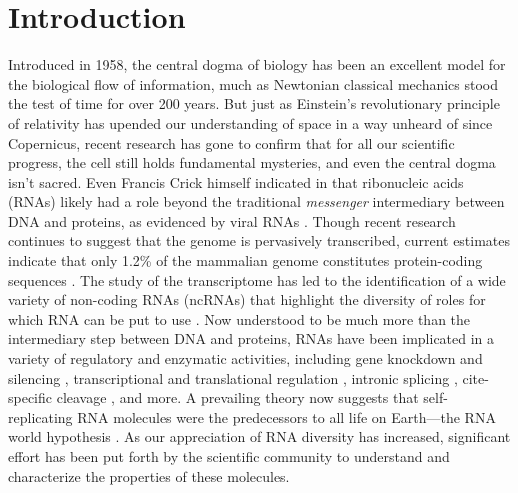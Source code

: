
\chapter{Introduction}
\label{ch:intro}


Introduced in 1958, the central dogma of biology has been an excellent model for
the biological flow of information, much as Newtonian classical mechanics stood the
test of time for over 200 years. But just as Einstein’s revolutionary principle of
relativity has upended our understanding of space in a way unheard of since
Copernicus, recent research has gone to confirm that for all our scientific
progress, the cell still holds fundamental mysteries, and even the central dogma
isn't sacred. Even Francis Crick himself indicated in \citep{crick:1970wb} that
ribonucleic acids (RNAs) likely had a role beyond the traditional {\em messenger}
intermediary between
DNA and proteins, as evidenced by viral RNAs \citep{coffin:1997ws}. Though recent
research continues to suggest that the genome is pervasively transcribed, current
estimates indicate that only 1.2\% of the mammalian genome constitutes
protein-coding sequences \citep{berretta:2009tq,clark:2011cc,jensen:2013vb}. The
study of the transcriptome has led to the identification of a wide variety of
non-coding RNAs (ncRNAs) that highlight the diversity of roles for which RNA can
be put to use \citep{costa:2005ug}. Now understood to be much more than the
intermediary step between DNA and proteins, RNAs have been implicated in a variety
of regulatory and enzymatic activities, including gene knockdown and silencing
\citep{fire:1998tv,mccaffrey:2002tf,hannon:2002vn,he:2004uk},
transcriptional and translational regulation \citep{nudler:2004vm,mandal:2004vh},
intronic splicing \citep{kruger:1982wk,cech:1990tn}, cite-specific cleavage
\citep{doherty:2001wq}, and more.
A prevailing theory now suggests that self-replicating RNA molecules were the
predecessors to all life on Earth---the RNA world hypothesis \citep{gilbert:1986td}.
As our appreciation of RNA diversity has increased,
significant effort has been put forth by the scientific community to understand
and characterize the properties of these molecules.

